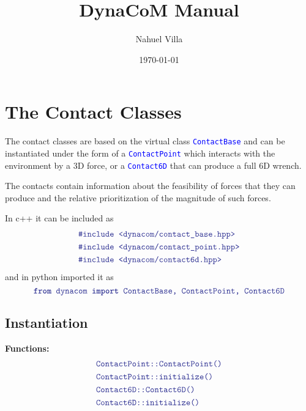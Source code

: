 \documentclass[12pt]{article}
\title{DynaCoM Manual}
\author{Nahuel Villa}
\date{\today}
\newcommand{\code}[2][Blue]{\textcolor{#1}{\texttt{#2}}}
\newcommand{\codebf}[2][Blue]{\textcolor{#1}{\texttt{\textbf{#2}}}}
\begin{document}
\maketitle{}

\tableofcontents

\clearpage
\newpage

\section{The Contact Classes}

The contact classes are based on the virtual class \code{ContactBase} and can be instantiated under the form of a \code{ContactPoint} which interacts with the environment by a $3$D force, or a \code{Contact6D} that can produce a full $6$D wrench.

The contacts contain information about the feasibility of forces that they can produce and the relative prioritization of the magnitude of such forces.

    In c++ it can be included as 
    \begin{align*}
    &\code{\#include <dynacom/contact\_base.hpp>}\\
    &\code{\#include <dynacom/contact\_point.hpp>}\\
    &\code{\#include <dynacom/contact6d.hpp>}
    \end{align*}
    and in python imported it as
    \begin{equation*}
    \codebf{from }\code{dynacom }\codebf{import }\code{ContactBase, ContactPoint, Contact6D}
    \end{equation*}

\subsection{Instantiation}
\hrulefill

{\bf Functions:}
    \begin{align*}
        &\code{ContactPoint::ContactPoint()}\\
        &\code{ContactPoint::initialize()}\\
        &\code{Contact6D::Contact6D()}\\
        &\code{Contact6D::initialize()}
    \end{align*}
\end{document}
